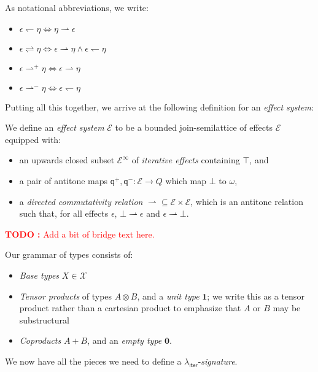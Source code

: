 \documentclass[acmsmall,screen,review]{acmart}
\newcounter{todos}
\newcommand{\TODO}[1]{{
  \stepcounter{todos}
  \begin{center}\large{\textcolor{red}{\textbf{TODO \arabic{todos}:} #1}}\end{center}
}}
\newcommand{\mc}[1]{\ensuremath{\mathcal{#1}}}
\newcommand{\mb}[1]{\ensuremath{\mathbf{#1}}}
\newcommand{\ms}[1]{\ensuremath{\mathsf{#1}}}
\newcommand{\subiterssa}{\(\lambda_{\ms{iter}}\)}
\newcommand{\rightmove}{\rightharpoonup}
\newcommand{\leftmove}{\leftharpoondown}
\newcommand{\slides}{\rightleftharpoons}
\newcommand{\topq}{\omega}
\newcommand{\alquant}{\ms{q}}
\begin{document}
As notational abbreviations, we write:
  \begin{itemize}
    \item $\epsilon \leftmove \eta \iff \eta \rightmove \epsilon$
    \item $\epsilon \slides \eta \iff \epsilon \rightmove \eta \land \epsilon \leftmove \eta$
    \item $\epsilon \rightmove^+ \eta \iff \epsilon \rightmove \eta$
    \item $\epsilon \rightmove^- \eta \iff \epsilon \leftmove \eta$
  \end{itemize}

 
Putting all this together, we arrive at the following definition for an
\emph{effect system}:
\begin{definition}
  We define an \emph{effect system} $\mc{E}$ to be a bounded join-semilattice of effects $\mc{E}$
  equipped with:
  \begin{itemize}
  \item an upwards closed subset $\mc{E}^\infty$ of \emph{iterative effects} containing $\top$, and
  \item a pair of antitone maps $\alquant^+, \alquant^- : \mc{E} \to Q$ which map $\bot$ to $\topq$,
  \item a \emph{directed commutativity relation} $\rightmove \subseteq \mc{E} \times \mc{E}$,
  which is an antitone relation   such that, for all effects
  $\epsilon$, $\bot \rightmove \epsilon$ and $\epsilon \rightmove \bot$. 
  \end{itemize}

\end{definition}

\TODO{Add a bit of bridge text here.}

Our grammar of types consists of:
\begin{itemize}
  \item \emph{Base types} $X \in \mc{X}$
  \item \emph{Tensor products} of types $A \otimes B$, and a \emph{unit type} $\mb{1}$; we write
  this as a tensor product rather than a cartesian product to emphasize that $A$ or $B$ may be
  substructural
  \item \emph{Coproducts} $A + B$, and an \emph{empty type} $\mb{0}$.
\end{itemize}

We now have all the pieces we need to define a \subiterssa{}-\emph{signature}.
\end{document}
